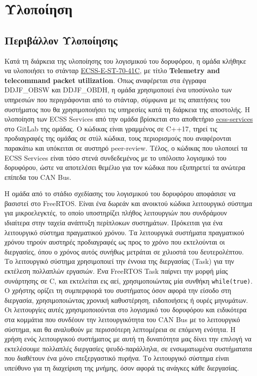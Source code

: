 \documentclass[a4paper,nobib,justified]{tufte-book}
\begin{document}
\chapter{Υλοποίηση}
\section{Περιβάλλον Υλοποίησης}

Κατά τη διάρκεια της υλοποίησης του λογισμικού του δορυφόρου, η ομάδα κλήθηκε να υλοποιήσει το στάνταρ \href{url}{ECSS-E-ST-70-41C}, με τίτλο \textbf{Telemetry and telecommand packet utilization}. Όπως αναφέρεται στα έγγραφα DDJF\_OBSW και DDJF\_OBDH, η ομάδα χρησιμοποιεί ένα υποσύνολο των υπηρεσιών που περιγράφονται από το στάνταρ, σύμφωνα με τις απαιτήσεις του συστήματος που θα χρησιμοποιήσει τις υπηρεσίες κατά τη διάρκεια της αποστολής. Η υλοποίηση των ECSS Services από την ομάδα βρίσκεται στο αποθετήριο \href{https://gitlab.com/acubesat/obc/ecss-services}{ecss-services} στο GitLab της ομάδας. Ο κώδικας είναι γραμμένος σε C++17, τηρεί τις προδιαγραφές της ομάδας σε στύλ κώδικα, τους περιορισμούς που αναφέρονται παρακάτω και υπόκειται σε αυστηρό peer-review. Τέλος, ο κώδικας που υλοποιεί τα ECSS Services είναι τόσο στενά συνδεδεμένος με το υπόλοιπο λογισμικό του δορυφόρου, ώστε να αποτελέσει θεμέλιο για τον κώδικα που εξυπηρετεί τα ανώτερα επίπεδα του CAN Bus. 

\par Η ομάδα από το στάδιο σχεδίασης του λογισμικού του δορυφόρου αποφάσισε να βασιστεί στο FreeRTOS. Είναι ένα δωρεάν και ανοικτού κώδικα λειτουργικό σύστημα για μικροελεγκτές, το οποίο υποστηρίζει πλήθος λειτουργιών που συνδράμουν ιδιαίτερα στην ταχεία ανάπτυξη περίπλοκων συστημάτων. Πρόκειται για ένα λειτουργικό σύστημα πραγματικού χρόνου. Τα λειτουργικά συστήματα πραγματικού χρόνου τηρούν αυστηρές προδιαγραφές ως προς το χρόνο που εκτελούνται οι διεργασίες, όπου ο χρόνος αυτός συνήθως μετράται σε χιλιοστά του δευτερολέπτου. Το λειτουργικό σύστημα χρησιμοποιεί την έννοια της διεργασίας (Task) για την εκτέλεση πολλαπλών εργασιών. Ένα FreeRTOS Task παίρνει την μορφή μίας συνάρτησης σε C, και εκτελείται εις αεί, χρησιμοποιώντας μία συνθήκη \texttt{while(true)}. Ο χρήστης ορίζει τη συμπερφιορά του συστήματος όσον αφορά την είσοδο στη διεργασία, χρησιμοποιώντας χρονική καθυστέρηση, ειδοποιήσεις ή ουρές μηνυμάτων. Οι λειτουργίες αυτές χρησιμοποιούνται στο λογισμικό του δορυφόρου και ειδικότερα στα κομμάτια που συνδέουν την λειτουργικότητα του CAN Bus με το λειτουργικό σύστημα, και θα αναλυθούν με περισσότερη λεπτομέρεια σε επόμενη ενότητα. Η χρήση ενός λειτουργικού συστήματος με αυτή τη δυνατότητα μας δίνει την επιλογή να εκτελέσουμε πολλαπλές διεργασίες ψευδό-παράλληλα, σε ενσωματωμένα συστήματατα που διαθέτουν ένα μόνο επεξεργαστικό πυρήνα. Το λειτουργικό σύστημα είναι υπεύθυνο για τη διαχείριση της μνήμης, όσον αφορά τις ανάγκες κάθε διεργασίας.
\end{document}
